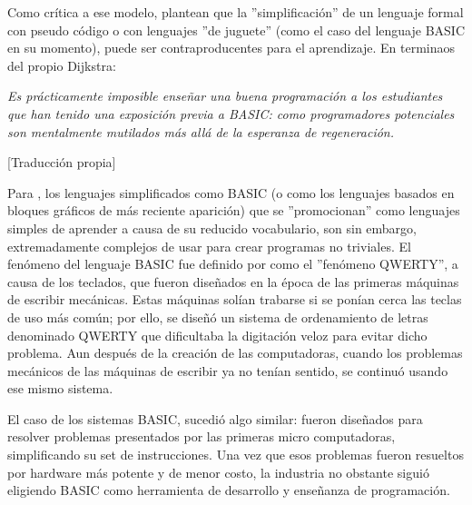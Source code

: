 Como crítica a ese modelo, \cite{dijkstra2010que} plantean que la ''simplificación'' de un lenguaje formal con pseudo código o con lenguajes ''de juguete'' (como el caso del lenguaje BASIC en su momento), puede ser contraproducentes para el aprendizaje. En terminaos del propio Dijkstra:

\begin{center}
\textit{Es prácticamente imposible enseñar una buena programación a los estudiantes que han tenido una exposición previa a BASIC: como programadores potenciales son mentalmente mutilados más allá de la esperanza de regeneración.}
\end{center}[Traducción propia]

Para \cite{seymour_papert_desafio_1987}, los lenguajes simplificados como BASIC (o como los lenguajes basados en bloques gráficos de más reciente aparición) que se  ''promocionan'' como lenguajes simples de aprender a causa de su reducido vocabulario, son sin embargo, extremadamente complejos de usar para crear programas no triviales. El fenómeno del lenguaje BASIC fue definido por \cite{seymour_papert_desafio_1987} como el ''fenómeno QWERTY'', a causa de los teclados, que fueron diseñados en la época de las primeras máquinas de escribir mecánicas. Estas máquinas solían trabarse si se ponían cerca las teclas de uso más común; por ello, se diseñó un sistema de ordenamiento de letras denominado QWERTY que dificultaba la digitación veloz para evitar dicho problema. Aun después de la creación de las computadoras, cuando los problemas mecánicos de las máquinas de escribir ya no tenían sentido, se continuó usando ese mismo sistema. 

El caso de los  sistemas BASIC, sucedió algo similar: fueron diseñados para resolver problemas presentados por las primeras micro computadoras, simplificando su set de instrucciones. Una vez que esos problemas fueron resueltos por hardware más potente y de menor costo, la industria no obstante siguió eligiendo BASIC como herramienta de desarrollo y enseñanza de programación. 


